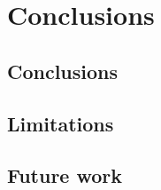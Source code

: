 \chapter{Conclusions}
\label{ch:conclusion}


\section{Conclusions}
\label{sec:concl_conclusions}

\section{Limitations}
\label{sec:concl_limitations}

\section{Future work}
\label{sec:concl_future}
